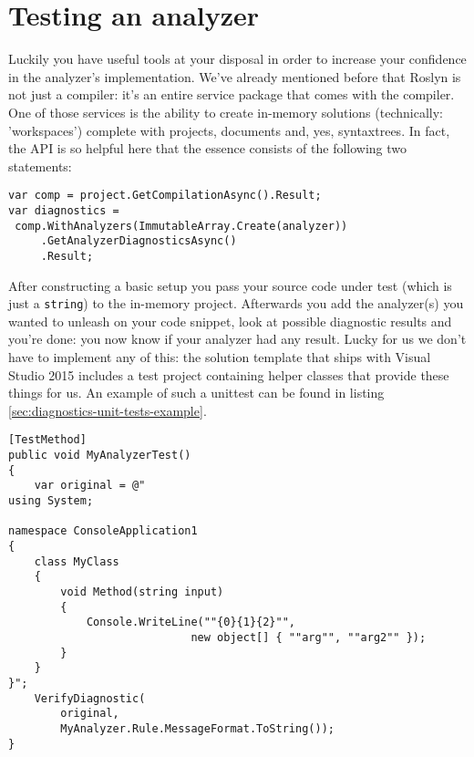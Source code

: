 \newpage

\section{Testing an analyzer}
\label{sec:diagnostic-testing}

Luckily you have useful tools at your disposal in order to increase your confidence in the analyzer's implementation. We've already mentioned before that Roslyn is not just a compiler: it's an entire service package that comes with the compiler. One of those services is the ability to create in-memory \glspl{solution} (technically: 'workspaces') complete with projects, documents and, yes, \glspl{syntaxtree}. In fact, the API is so helpful here that the essence consists of the following two statements:

\begin{lstlisting}[label={sec:diagnostics-unit-tests-analysis}]
var comp = project.GetCompilationAsync().Result;
var diagnostics = 
 comp.WithAnalyzers(ImmutableArray.Create(analyzer))
     .GetAnalyzerDiagnosticsAsync()
     .Result;
\end{lstlisting}

After constructing a basic setup you pass your source code under test (which is just a \texttt{string}) to the in-memory project. Afterwards you add the analyzer(s) you wanted to unleash on your code snippet, look at possible diagnostic results and you're done: you now know if your analyzer had any result. Lucky for us we don't have to implement any of this: the \gls{solution} template that ships with Visual Studio 2015 includes a test project containing helper classes that provide these things for us. An example of such a \gls{unittest} can be found in listing \ref{sec:diagnostics-unit-tests-example}.

\clearpage

\begin{minipage}{\linewidth}
\begin{lstlisting}[label={sec:diagnostics-unit-tests-example}]
[TestMethod]
public void MyAnalyzerTest()
{
	var original = @"
using System;

namespace ConsoleApplication1
{
    class MyClass
    {   
        void Method(string input)
        {
            Console.WriteLine(""{0}{1}{2}"", 
							new object[] { ""arg"", ""arg2"" });
        }
    }
}";
	VerifyDiagnostic(
		original, 
		MyAnalyzer.Rule.MessageFormat.ToString());
}
\end{lstlisting}
\end{minipage}

